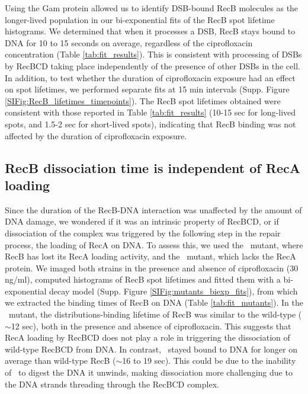 Using the Gam protein allowed us to identify DSB-bound RecB molecules as the longer-lived population in our bi-exponential fits of the RecB spot lifetime histograms. We determined that when it processes a DSB, RecB stays bound to DNA for 10 to 15 seconds on average, regardless of the ciprofloxacin concentration (Table \ref{tab:fit_results}). This is consistent with processing of DSBs by RecBCD taking place independently of the presence of other DSBs in the cell. In addition, to test whether the duration of ciprofloxacin exposure had an effect on spot lifetimes, we performed separate fits at 15 min intervals (Supp. Figure \ref{SIFig:RecB_lifetimes_timepoints}). The RecB spot lifetimes obtained were consistent with those reported in Table \ref{tab:fit_results} (10-15 sec for long-lived spots, and 1.5-2 sec for short-lived spots), indicating that RecB binding was not affected by the duration of ciprofloxacin exposure.

\subsection*{RecB dissociation time is independent of RecA loading}
Since the duration of the RecB-DNA interaction was unaffected by the amount of DNA damage, we wondered if it was an intrinsic property of RecBCD, or if dissociation of the complex was triggered by the following step in the repair process, the loading of RecA on DNA. To assess this, we used the \geneteneighty\ mutant, where RecB has lost its RecA loading activity, and the \dreca\ mutant, which lacks the RecA protein. We imaged both strains in the presence and absence of ciprofloxacin (30 ng/ml), computed histograms of RecB spot lifetimes and fitted them with a bi-exponential decay model (Supp. Figure \ref{SIFig:mutants_biexp_fits}), from which we extracted the binding times of RecB on DNA (Table \ref{tab:fit_mutants}). In the \dreca\ mutant, the distributions-binding lifetime of RecB was similar to the wild-type ($\sim$12 sec), both in the presence and absence of ciprofloxacin. This suggests that RecA loading by RecBCD does not play a role in triggering the dissociation of wild-type RecBCD from DNA. In contrast, \teneighty\ stayed bound to DNA for longer on average than wild-type RecB ($\sim$16 to 19 sec). This could be due to the inability of \teneighty\ to digest the DNA it unwinds, making dissociation more challenging due to the DNA strands threading through the RecBCD complex.

